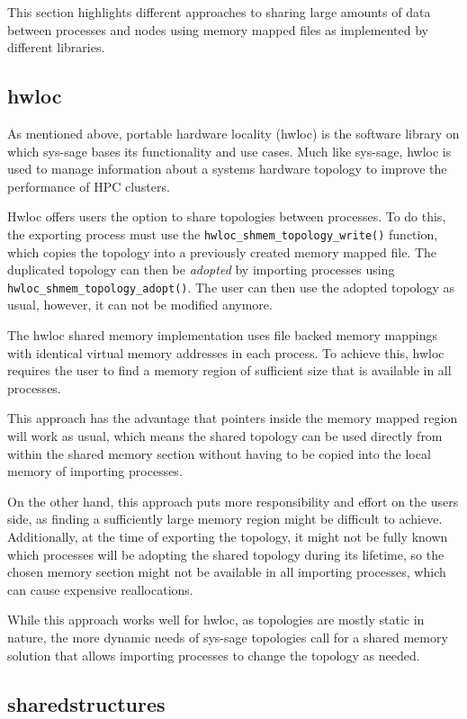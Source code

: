 This section highlights different approaches to sharing large amounts of data between processes and nodes using memory mapped files as implemented by different libraries.

\subsection*{hwloc}
As mentioned above, portable hardware locality (hwloc) is the software library on which sys-sage bases its functionality and use cases.
Much like sys-sage, hwloc is used to manage information about a systems hardware topology to improve the performance of HPC clusters.

Hwloc offers users the option to share topologies between processes. To do this, the exporting process must use the \lstinline|hwloc_shmem_topology_write()| function,
which copies the topology into a previously created memory mapped file. The duplicated topology can then be \emph{adopted} by importing processes using \lstinline|hwloc_shmem_topology_adopt()|.
The user can then use the adopted topology as usual, however, it can not be modified anymore. \cite{hwloc_docs}

The hwloc shared memory implementation uses file backed memory mappings with identical virtual memory addresses in each process.
To achieve this, hwloc requires the user to find a memory region of sufficient size that is available in all processes.

This approach has the advantage that pointers inside the memory mapped region will work as usual,
which means the shared topology can be used directly from within the shared memory section without having to be copied into the local memory of importing processes.

On the other hand, this approach puts more responsibility and effort on the users side, as finding a sufficiently large memory region might be difficult to achieve.
Additionally, at the time of exporting the topology, it might not be fully known which processes will be adopting the shared topology during its lifetime, so the chosen memory section might not be available in
all importing processes, which can cause expensive reallocations.

While this approach works well for hwloc, as topologies are mostly static in nature, the more dynamic needs of sys-sage topologies call for a shared memory solution that allows importing processes to change the topology as needed.

\subsection*{sharedstructures}

